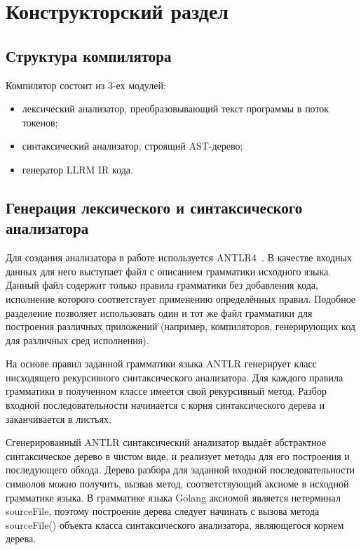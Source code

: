 \section{Конструкторский раздел}\label{sec:construct}

\subsection{Структура компилятора}\label{subsec:structure}
Компилятор состоит из 3-ех модулей:
\begin{itemize}
    \item лексический анализатор, преобразовывающий текст программы в поток токенов;
    \item синтаксический анализатор, строящий AST-дерево;
    \item генератор LLRM IR кода.
\end{itemize}

\subsection{Генерация лексического и синтаксического анализатора}\label{subsec:lex_synt_gen}
Для создания анализатора в работе используется ANTLR4~\cite{antlr}.
В качестве входных данных для него выступает файл с описанием грамматики исходного языка.
Данный файл содержит только правила грамматики без добавления кода, исполнение которого соответствует применению определённых правил.
Подобное разделение позволяет использовать один и тот же файл грамматики для построения различных приложений
(например, компиляторов, генерирующих код для различных сред исполнения).

На основе правил заданной грамматики языка ANTLR генерирует класс нисходящего рекурсивного синтаксического анализатора.
Для каждого правила грамматики в полученном классе имеется свой рекурсивный метод.
Разбор входной последовательности начинается с корня синтаксического дерева и заканчивается в листьях.

Сгенерированный ANTLR синтаксический анализатор выдаёт абстрактное синтаксическое дерево в чистом виде, и реализует методы для
его построения и последующего обхода.
Дерево разбора для заданной входной последовательности символов можно получить, вызвав метод, соответствующий аксиоме
в исходной грамматике языка.
В грамматике языка Golang аксиомой является нетерминал sourceFile, поэтому построение дерева следует начинать с вызова
метода sourceFile() объекта класса синтаксического анализатора, являющегося корнем дерева.

